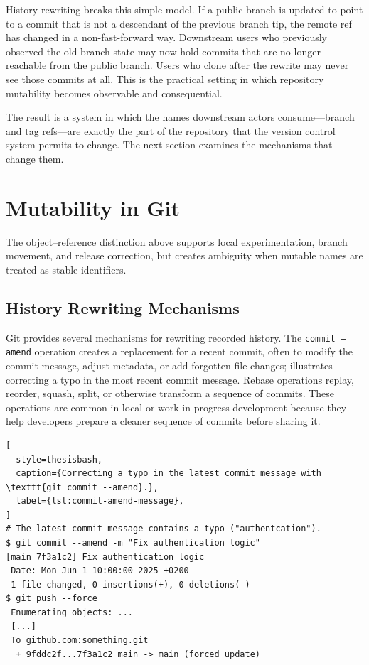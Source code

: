 History rewriting breaks this simple model.
If a public branch is updated to point to a commit that is not a descendant of the previous branch tip, the remote ref has changed in a non-fast-forward way.
Downstream users who previously observed the old branch state may now hold commits that are no longer reachable from the public branch.
Users who clone after the rewrite may never see those commits at all.
This is the practical setting in which repository mutability becomes observable and consequential.

The result is a system in which the names downstream actors consume---branch and tag refs---are exactly the part of the repository that the version control system permits to change.
The next section examines the mechanisms that change them.

\section{Mutability in Git}
\label{sec:bg-mutability-git}

The object--reference distinction above supports local experimentation, branch movement, and release correction, but creates ambiguity when mutable names are treated as stable identifiers.

\subsection{History Rewriting Mechanisms}
\label{subsec:bg-history-rewriting}

Git provides several mechanisms for rewriting recorded history.
The \texttt{commit --amend} operation creates a replacement for a recent commit, often to modify the commit message, adjust metadata, or add forgotten file changes;  illustrates correcting a typo in the most recent commit message.
Rebase operations replay, reorder, squash, split, or otherwise transform a sequence of commits.
These operations are common in local or work-in-progress development because they help developers prepare a cleaner sequence of commits before sharing it.

\begin{lstlisting}[
  style=thesisbash,
  caption={Correcting a typo in the latest commit message with \texttt{git commit --amend}.},
  label={lst:commit-amend-message},
]
# The latest commit message contains a typo ("authentcation").
$ git commit --amend -m "Fix authentication logic"
[main 7f3a1c2] Fix authentication logic
 Date: Mon Jun 1 10:00:00 2025 +0200
 1 file changed, 0 insertions(+), 0 deletions(-)
$ git push --force
 Enumerating objects: ...
 [...]
 To github.com:something.git
  + 9fddc2f...7f3a1c2 main -> main (forced update)
\end{lstlisting}

